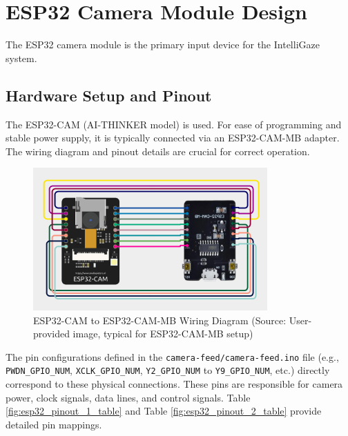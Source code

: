 \documentclass[12pt, a4paper]{report}
\begin{document}
\section{ESP32 Camera Module Design}
The ESP32 camera module is the primary input device for the IntelliGaze system.
\subsection{Hardware Setup and Pinout}
The ESP32-CAM (AI-THINKER model) is used. For ease of programming and stable power supply, it is typically connected via an ESP32-CAM-MB adapter. The wiring diagram and pinout details are crucial for correct operation.
\begin{figure}[H]
    \centering
    \includegraphics[width=0.8\textwidth]{fig/esp32_wiring.png}
    \caption{ESP32-CAM to ESP32-CAM-MB Wiring Diagram (Source: User-provided image, typical for ESP32-CAM-MB setup)}
    \label{fig:esp32_wiring}
\end{figure}

The pin configurations defined in the \texttt{camera-feed/camera-feed.ino} file (e.g., \texttt{PWDN\_GPIO\_NUM}, \texttt{XCLK\_GPIO\_NUM}, \texttt{Y2\_GPIO\_NUM} to \texttt{Y9\_GPIO\_NUM}, etc.) directly correspond to these physical connections. These pins are responsible for camera power, clock signals, data lines, and control signals. Table \ref{fig:esp32_pinout_1_table} and Table \ref{fig:esp32_pinout_2_table} provide detailed pin mappings.
\end{document}

